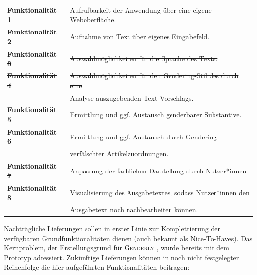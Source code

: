 \documentclass[paper=a4, parskip=half]{scrreprt}
\newcommand{\Genderly}{\textsc{Genderly }}
\begin{document}
\begin{table}[!htb]
\begin{tabular}{ll}
\textbf{Funktionalität 1} & Aufrufbarkeit der Anwendung über eine eigene Weboberfläche. \vspace{0.1cm} \\
\textbf{Funktionalität 2} & Aufnahme von Text über eigenes Eingabefeld. \vspace{0.1cm} \\
\sout{\textbf{Funktionalität 3}} & \sout{Auswahlmöglichkeiten für die Sprache des Texts.} \vspace{0.1cm} \\
\sout{\textbf{Funktionalität 4}} & \sout{Auswahlmöglichkeiten für den Gendering-Stil des durch eine} \\
 & \sout{Analyse auszugebenden Text-Vorschlags.} \vspace{0.1cm} \\
\textbf{Funktionalität 5} & Ermittlung und ggf. Austausch genderbarer Substantive. \vspace{0.1cm} \\
\textbf{Funktionalität 6} & Ermittlung und ggf. Austausch durch Gendering \\
& verfälschter Artikelzuordnungen. \vspace{0.1cm} \\
\sout{\textbf{Funktionalität 7}} & \sout{Anpassung der farblichen Darstellung durch Nutzer*innen} \vspace{0.1cm} \\
\textbf{Funktionalität 8} & Visualisierung des Ausgabetextes, sodass Nutzer*innen den \\
 & Ausgabetext noch nachbearbeiten können. \vspace{0.1cm} \\
\end{tabular}
\end{table}

Nachträgliche Lieferungen sollen in erster Linie zur Komplettierung der verfügbaren Grundfunktionalitäten dienen (auch bekannt als Nice-To-Haves). Das Kernproblem, der Erstellungsgrund für \Genderly, wurde bereits mit dem Prototyp adressiert. Zukünftige Lieferungen können in noch nicht festgelegter Reihenfolge die hier aufgeführten Funktionalitäten beitragen:
\end{document}
